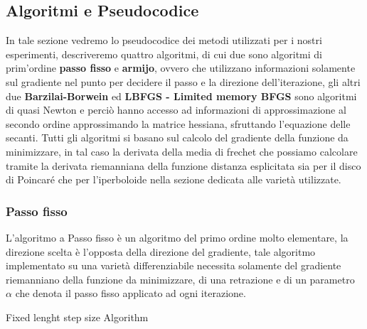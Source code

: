 \documentclass[a4paper, 12pt]{article}
\begin{document}
\subsection{Algoritmi e Pseudocodice}
In tale sezione vedremo lo pseudocodice dei metodi utilizzati per i nostri esperimenti, descriveremo quattro algoritmi, di cui due sono algoritmi di prim'ordine \textbf{passo fisso} e \textbf{armijo}, ovvero che utilizzano informazioni solamente sul gradiente nel punto per decidere il passo e la direzione dell'iterazione, gli altri due \textbf{Barzilai-Borwein} ed \textbf{LBFGS - Limited memory BFGS} sono algoritmi di quasi Newton e perciò hanno accesso ad informazioni di approssimazione al secondo ordine approssimando la matrice hessiana, sfruttando l'equazione delle secanti. Tutti gli algoritmi si basano sul calcolo del gradiente della funzione da minimizzare, in tal caso la derivata della media di frechet che possiamo calcolare tramite la derivata riemanniana della funzione distanza esplicitata sia per il disco di Poincaré che per l'iperboloide nella sezione dedicata alle varietà utilizzate.
\subsubsection{Passo fisso}
L'algoritmo a Passo fisso è un algoritmo del primo ordine molto elementare, la direzione scelta è l'opposta della direzione del gradiente, tale algoritmo implementato su una varietà differenziabile necessita solamente del gradiente riemanniano della funzione da minimizzare, di una retrazione e di un parametro $\alpha$ che denota il passo fisso applicato ad ogni iterazione.\\
\begin{center}
\begin{algorithm}[H]
\SetAlgoLined
{}
\caption{Fixed lenght step size Algorithm}
\end{algorithm}
\end{center}
\end{document}
